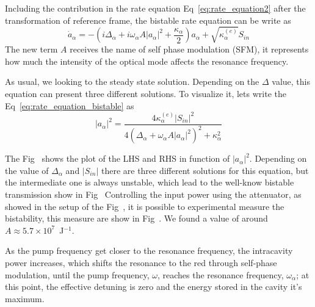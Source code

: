 Including the contribution in the rate equation Eq~\ref{eq:rate_equation2} after the transformation of reference frame, the bistable rate equation can be write as 
\begin{equation}
\dot{a}_\alpha = -\left(i\Delta_\alpha + i\omega_\alpha A|a_\alpha|^2 + \frac{\kappa_\alpha}{2}\right)a_\alpha + \sqrt{\kappa^{(e)}_\alpha}S_{in}
\label{eq:rate_equation_bistable}
\end{equation}
The new term $A$ receives the name of self phase modulation (SFM), it represents how much the intensity of the optical mode affects the resonance frequency.

As usual, we looking to the steady state solution. Depending on the $\Delta$ value, this equation can present three different solutions. To visualize it, lets write the Eq~\ref{eq:rate_equation_bistable} as 
\begin{equation}
    |a_\alpha|^2 = \frac{4\kappa^{(e)}_\alpha |S_{in}|^2}{4\left(\Delta_\alpha + \omega_\alpha A|a_\alpha|^2\right)^2+\kappa_\alpha^2} 
\end{equation}

The Fig~
shows the plot of the LHS and RHS in function of $|a_\alpha|^2$. Depending on the value of $\Delta_\alpha$ and $|S_{in}|$ there are three different solutions for this equation, but the intermediate one is always unstable, which lead to the well-know bistable transmission show in Fig~
Controlling the input power using the attenuator, as showed in the setup of the Fig~, it is possible to experimental measure the bistability, this measure are show in Fig~. We found a value of around $A\approx 5.7\times10^7$~J$^{-1}$.

As the pump frequency get closer to the resonance frequency, the intracavity power increases, which shifts the resonance to the red through self-phase modulation, until the pump frequency, $\omega$, reaches the resonance frequency, $\omega_\alpha$; at this point, the effective detuning is zero and the energy stored in the cavity it's maximum.  

